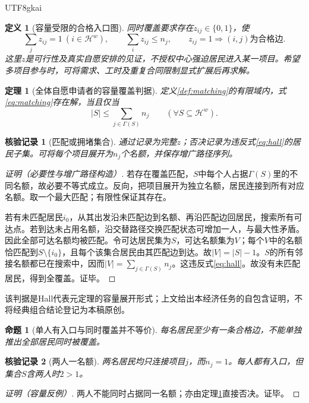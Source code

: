 \documentclass[12pt,a4paper,openany]{report}
\newtheorem{definition}{定义}[chapter]
\newtheorem{theorem}{定理}[chapter]
\newtheorem{proposition}{命题}[chapter]
\newtheorem{Certificate}{核验记录}[chapter]
\newcommand{\HH}{\mathcal H}
\begin{document}
\begin{CJK*}{UTF8}{gkai}
\begin{definition}[容量受限的合格入口图]
同时覆盖要求存在$z_{ij}\in\{0,1\}$，使
\begin{equation}\label{eq:matching}
 \sum_jz_{ij}=1\ (i\in\HH^w),\qquad
 \sum_i z_{ij}\le n_j,\qquad
 z_{ij}=1\Longrightarrow(i,j)\text{为合格边}.
\end{equation}
这里$z$是可行性及真实自愿安排的见证，不授权中心强迫居民进入某一项目。希望多项目参与时，可将需求、工时及重复合同限制显式扩展后再求解。
\end{definition}
\begin{theorem}[全体自愿申请者的容量覆盖判据]
\label{thm:hall}
定义\ref{def:matching}的有限域内，式\eqref{eq:matching}存在解，当且仅当
\begin{equation}\label{eq:hall}
 |S|\le\sum_{j\in\Gamma(S)}n_j
 \qquad(\forall S\subseteq\HH^w).
\end{equation}
\end{theorem}
\begin{Certificate}[匹配或拥堵集合]
通过记录为完整$z$；否决记录为违反式\eqref{eq:hall}的居民子集。可将每个项目展开为$n_j$个名额，并保存增广路径序列。
\end{Certificate}
\begin{proof}[证明（必要性与增广路径构造）]
若存在覆盖匹配，$S$中每个人占据$\Gamma(S)$里的不同名额，故必要不等式成立。反向，把项目展开为独立名额，居民连接到所有对应名额。取一个最大匹配；有限性保证其存在。

若有未匹配居民$i_0$，从其出发沿未匹配边到名额、再沿匹配边回居民，搜索所有可达点。若到达未占用名额，沿交替路径交换匹配状态可增加一人，与最大性矛盾。因此全部可达名额均被匹配。令可达居民集为$S$，可达名额集为$V$；每个$V$中的名额恰匹配到$S\setminus\{i_0\}$，且每个该集合居民由其匹配边到达。故$|V|=|S|-1$。$S$的所有邻接名额都已在搜索中，因而$|V|=\sum_{j\in\Gamma(S)}n_j$。这违反式\eqref{eq:hall}。故没有未匹配居民，得到全覆盖。证毕。
\end{proof}
该判据是Hall代表元定理的容量展开形式\cite{Hall1935}；上文给出本经济任务的自包含证明，不将经典组合结论登记为本稿原创。

\begin{proposition}[单人有入口与同时覆盖并不等价]
\label{prop:access-failure}
每名居民至少有一条合格边，不能单独推出全部居民同时被覆盖。
\end{proposition}
\begin{Certificate}[两人一名额]
两名居民均只连接项目$j$，而$n_j=1$。每人都有入口，但集合$S$含两人时$2>1$。
\end{Certificate}
\begin{proof}[证明（容量反例）]
两人不能同时占据同一名额；亦由定理\ref{thm:hall}直接否决。证毕。
\end{proof}


\end{CJK*}
\end{document}
